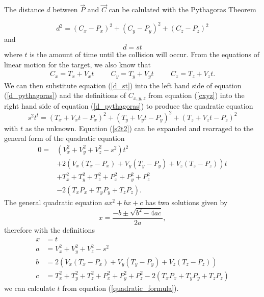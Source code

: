 \documentclass[12pt,a4paper]{report}
\begin{document}
The distance $d$ between $\vec{P}$ and $\vec{C}$ can be calulated with the Pythagoras Theorem

\begin{equation}
	d^{2} = \left(C_{x}-P_{x}\right)^{2} + \left(C_{y}-P_{y}\right)^{2} + \left(C_{z}-P_{z}\right)^{2}
	\label{d_pythagoras}
\end{equation}
and 
\begin{equation}
	d = st
	\label{d_st}
\end{equation}
where $t$ is the amount of time until the collision will occur. From the equations of linear motion for the target, we also know that
\begin{align}
	C_{x} = T_{x} + V_{x}t
	\hspace{1cm}
	C_{y} = T_{y} + V_{y}t
	\hspace{1cm}
	C_{z} = T_{z} + V_{z}t.
	\label{cxyz}
\end{align}
We can then substitute equation (\ref{d_st}) into the left hand side of equation (\ref{d_pythagoras}) and the definitions of $C_{x,y,z}$ from equation (\ref{cxyz}) into the right hand side of equation (\ref{d_pythagoras}) to produce the quadratic equation
\begin{equation}
	s^{2}t^{t} = \left(T_{x} + V_{x}t - P_{x}\right)^{2} + \left(T_{y} + V_{y}t - P_{y}\right)^{2} + \left(T_{z} + V_{z}t - P_{z}\right)^{2}
	\label{s2t2}
\end{equation}
with $t$ as the unknown. Equation (\ref{s2t2}) can be expanded and rearraged to the general form of the quadratic equation
\begin{align}
	0 =&\left(V_{x}^{2}+V_{y}^{2}+V_{z}^{2} - s^2\right)t^{2}\\
 	&+ 2\left(V_{x}\left(T_{x}- P_{x}\right) + V_{y}\left(T_{y}- P_{y}\right)+V_{z}\left(T_{z}- P_{z}\right)\right)t\\
	&+ T_{x}^{2} + T_{y}^{2} + T_{z}^{2} + P_{x}^{2} + P_{y}^{2} + P_{z}^{2}\\
	&- 2\left(T_{x}P_{x} + T_{y}P_{y} + T_{z}P_{z}\right).
\end{align}
The general quadratic equation $ax^{2}+bx+c$ has two solutions given by
\begin{equation}
	x = \frac{-b \pm \sqrt{b^{2}-4ac}}{2a},
	\label{quadratic_formula}
\end{equation}
therefore with the definitions
\begin{align}
	x &= t\\
	a &= V_{x}^{2}+V_{y}^{2}+V_{z}^{2} - s^2\\
	b &= 2\left(V_{x}\left(T_{x}- P_{x}\right) + V_{y}\left(T_{y}- P_{y}\right)+V_{z}\left(T_{z}- P_{z}\right)\right)\\
	c &= T_{x}^{2} + T_{y}^{2} + T_{z}^{2} + P_{x}^{2} + P_{y}^{2} + P_{z}^{2} - 2\left(T_{x}P_{x} + T_{y}P_{y} + T_{z}P_{z}\right)
\end{align}
we can calculate $t$ from equation (\ref{quadratic_formula}).
\end{document}
